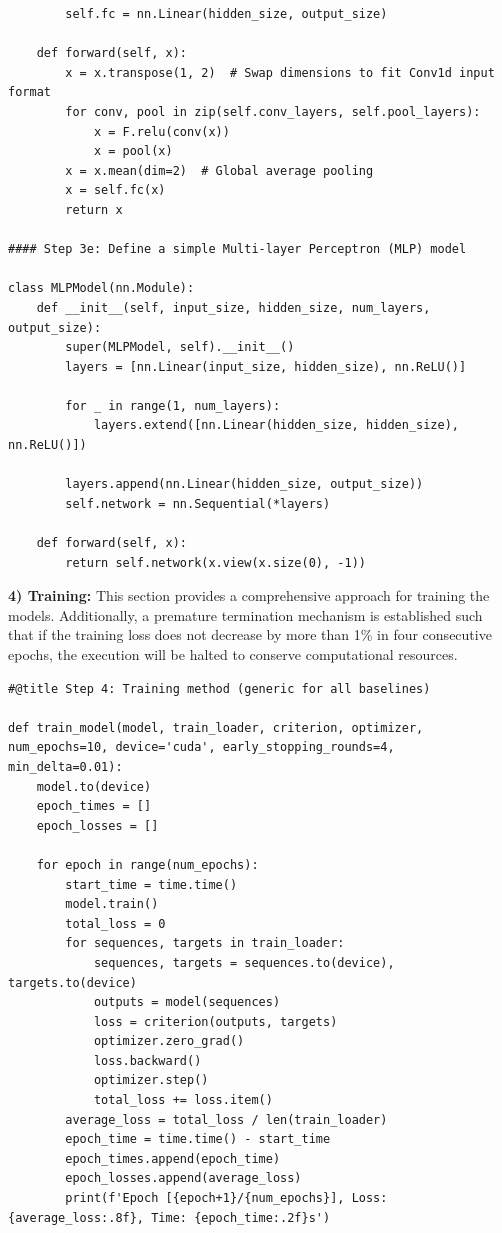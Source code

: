 \documentclass[journal,onecolumn]{IEEEtran}
\begin{document}
{\begin{appendices}
\begin{verbatim}
        self.fc = nn.Linear(hidden_size, output_size)

    def forward(self, x):
        x = x.transpose(1, 2)  # Swap dimensions to fit Conv1d input format
        for conv, pool in zip(self.conv_layers, self.pool_layers):
            x = F.relu(conv(x))
            x = pool(x)
        x = x.mean(dim=2)  # Global average pooling
        x = self.fc(x)
        return x
    
#### Step 3e: Define a simple Multi-layer Perceptron (MLP) model

class MLPModel(nn.Module):
    def __init__(self, input_size, hidden_size, num_layers, output_size):
        super(MLPModel, self).__init__()
        layers = [nn.Linear(input_size, hidden_size), nn.ReLU()]

        for _ in range(1, num_layers):
            layers.extend([nn.Linear(hidden_size, hidden_size), nn.ReLU()])

        layers.append(nn.Linear(hidden_size, output_size))
        self.network = nn.Sequential(*layers)

    def forward(self, x):
        return self.network(x.view(x.size(0), -1))
\end{verbatim}

\textbf{4) Training: } This section provides a comprehensive approach for training the models. Additionally, a premature termination mechanism is established such that if the training loss does not decrease by more than 1\% in four consecutive epochs, the execution will be halted to conserve computational resources.
\begin{verbatim}
#@title Step 4: Training method (generic for all baselines)

def train_model(model, train_loader, criterion, optimizer, num_epochs=10, device='cuda', early_stopping_rounds=4, min_delta=0.01):
    model.to(device)
    epoch_times = []
    epoch_losses = []

    for epoch in range(num_epochs):
        start_time = time.time()
        model.train()
        total_loss = 0
        for sequences, targets in train_loader:
            sequences, targets = sequences.to(device), targets.to(device)
            outputs = model(sequences)
            loss = criterion(outputs, targets)
            optimizer.zero_grad()
            loss.backward()
            optimizer.step()
            total_loss += loss.item()
        average_loss = total_loss / len(train_loader)
        epoch_time = time.time() - start_time
        epoch_times.append(epoch_time)
        epoch_losses.append(average_loss)
        print(f'Epoch [{epoch+1}/{num_epochs}], Loss: {average_loss:.8f}, Time: {epoch_time:.2f}s')


\end{verbatim}
\end{appendices}}
\end{document}
